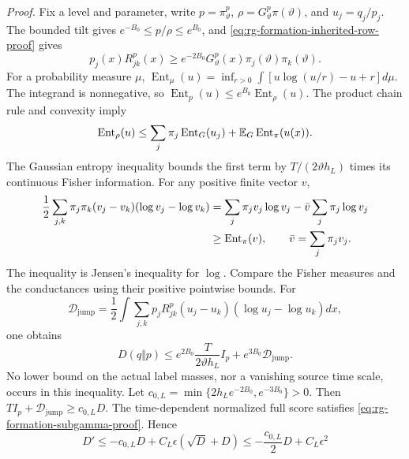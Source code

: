 \emph{Proof.}
Fix a level and parameter, write
$p=\pi_\vartheta^p$, $\rho=G_\vartheta^p\pi(\vartheta)$, and
$u_j=q_j/p_j$. The bounded tilt gives
$e^{-B_0}\le p/\rho\le e^{B_0}$, and
\cref{eq:rg-formation-inherited-row-proof} gives
\begin{equation}
 p_j(x)R_{jk}^p(x)
 \ge e^{-2B_0}G_\vartheta^p(x)
                    \pi_j(\vartheta)\pi_k(\vartheta).
 \label{eq:rg-formation-conductance-comparison}
\end{equation}
For a probability measure $\mu$,
$\operatorname{Ent}_\mu(u)=\inf_{r>0}\int[u\log(u/r)-u+r]d\mu$.
The integrand is nonnegative, so
$\operatorname{Ent}_p(u)\le e^{B_0}\operatorname{Ent}_\rho(u)$.
The product chain rule and convexity imply
\begin{equation}
 \operatorname{Ent}_\rho(u)
 \le\sum_j\pi_j\operatorname{Ent}_G(u_j)+\mathbb E_G\operatorname{Ent}_{\pi}(u(x)).
 \label{eq:rg-formation-product-entropy-bound}
\end{equation}
The Gaussian entropy inequality bounds the first term by
$T/(2\vartheta h_L)$ times its continuous Fisher information.
For any positive finite vector $v$,
\begin{align}
 \frac12\sum_{j,k}\pi_j\pi_k
       (v_j-v_k)(\log v_j-\log v_k)
 &=\sum_j\pi_jv_j\log v_j
       -\bar v\sum_j\pi_j\log v_j
 \notag\\
 &\ge \operatorname{Ent}_\pi(v),\qquad \bar v=\sum_j\pi_jv_j.
 \label{eq:rg-formation-categorical-entropy-bound}
\end{align}
The inequality is Jensen's inequality for $\log$.
Compare the Fisher measures and the conductances using their positive
pointwise bounds. For
\begin{equation}
 \mathcal D_{\mathrm{jump}}
 =\frac12\int\sum_{j,k}p_jR_{jk}^p
           (u_j-u_k)(\log u_j-\log u_k)dx,
 \label{eq:rg-formation-jump-dissipation}
\end{equation}
one obtains
\begin{equation}
 D(q\Vert p)\le
 e^{2B_0}\frac{T}{2\vartheta h_L}I_p
       +e^{3B_0}\mathcal D_{\mathrm{jump}}.
 \label{eq:rg-formation-joint-coercivity}
\end{equation}
No lower bound on the actual label masses, nor a vanishing source
time scale, occurs in this inequality. Let
$c_{0,L}=\min\{2h_Le^{-2B_0},e^{-3B_0}\}>0$.
Then $TI_p+\mathcal D_{\mathrm{jump}}\ge c_{0,L}D$.
The time-dependent normalized full score satisfies
\cref{eq:rg-formation-subgamma-proof}. Hence
\begin{equation}
 D'\le-c_{0,L}D+
       C_L\epsilon(\sqrt D+D)
 \le-\frac{c_{0,L}}{2}D+C_L\epsilon^2
 \label{eq:rg-formation-joint-moving-reference}
\end{equation}
